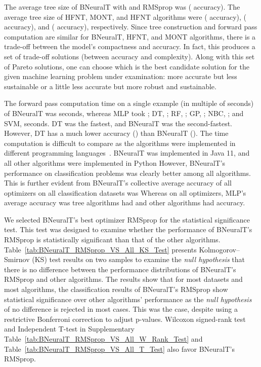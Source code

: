\documentclass[11pt,a4paper]{article}
\begin{document}
    The average tree size of BNeuralT with  and RMSprop was  ( accuracy). The average tree size of HFNT, MONT, and HFNT algorithms were  ( accuracy),  ( accuracy), and  ( accuracy), respectively. Since tree construction and forward pass computation are similar for BNeuralT, HFNT, and MONT algorithms, there is a trade-off between the model's compactness and accuracy. In fact, this produces a set of trade-off solutions (between accuracy and complexity). Along with this set of Pareto solutions, one can choose which is the best candidate solution for the given machine learning problem under examination: more accurate but less sustainable or a little less accurate but more robust and sustainable.
    
    The forward pass computation time on a single example (in multiple of  seconds) of BNeuralT was  seconds, whereas MLP took ; DT, ; RF, ; GP, ; NBC, ; and SVM,  seconds. DT was the fastest, and BNeuralT was the second-fastest. However, DT has a much lower accuracy () than BNeuralT (). The time computation is difficult to compare as the algorithms were implemented in different programming languages~\citep{pereira2017energy}. BNeuralT was implemented in Java 11, and all other algorithms were implemented in Python  However, BNeuralT's performance on classification problems was clearly better among all algorithms. This is further evident from BNeuralT's collective average accuracy of all optimizers on all classification datasets was  Whereas on all optimizers, MLP's average accuracy was  tree algorithms had  and other algorithms had  accuracy.
    
    We selected BNeuralT's best optimizer RMSprop for the statistical significance test. This test was designed to examine whether the performance of BNeuralT's RMSprop is statistically significant than that of the other algorithms.  Table~\ref{tab:BNeuralT_RMSprop_VS_All_KS_Test} presents Kolmogorov–Smirnov (KS) test results on two samples to examine the \textit{null hypothesis} that there is no difference between the performance distributions of BNeuralT's RMSprop and other algorithms. The results show that for most datasets and most algorithms, the classification results of BNeuralT's RMSprop show statistical significance over other algorithms' performance as the \textit{null hypothesis} of no difference is rejected in most cases. This was the case, despite using a restrictive Bonferroni correction to adjust p-values. Wilcoxon signed-rank test and Independent T-test in Supplementary Table~\ref{tab:BNeuralT_RMSprop_VS_All_W_Rank_Test} and Table~\ref{tab:BNeuralT_RMSprop_VS_All_T_Test} also favor BNeuralT's RMSprop.
    
\end{document}
